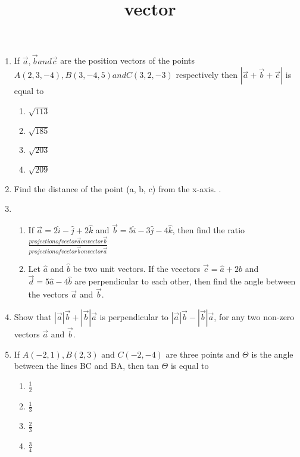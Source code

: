 \documentclass{article}
\title{vector}
\begin{document}
\begin{enumerate}
\item If $\vec{a}, \vec{b}and \vec{c}$ are the position vectors of the points $A(2,3,-4), B(3,-4,5) and C(3,2,-3)$ respectively then $|\vec{a} + \vec{b} + \vec{c}|$ is equal to
\begin{enumerate}[label=(\Alph*)]
\item $\sqrt{113}$
\item $\sqrt{185}$
\item $\sqrt{203}$
\item $\sqrt{209}$
\end{enumerate}
\item Find the distance of the point (a, b, c) from the x-axis.
.\item \begin{enumerate} %
		\item If $\vec{a}= 2\hat{i} - \hat{j} + 2\hat{k}$ and $\vec{b} = 5\hat{i} - 3\hat{j} - 4\hat{k}$, then find the ratio
	\\ $\frac{projection of vector \vec{a} on vector \vec{b}}{projection of vector \vec{b} on vector \vec{a}}$
\item Let $\hat{a}$ and $\hat{b}$ be two unit vectors. If the vecctors $\vec{c} = \hat{a} + 2\hat{b}$ and $\vec{d} = 5\hat{a} - 4\hat{b}$ are perpendicular to each other, then find the angle between the vectors $\vec{a}$ and $\vec{b}.$ 
\end{enumerate}
\item Show that $|\vec{a}|\vec{b} +|\vec{b}|\vec{a}$ is perpendicular to $|\vec{a} |\vec{b} - |\vec{b}|\vec{a}$, for any two non-zero vectors $\vec{a}$ and $\vec{b}.$
\item If $A(-2,1), B(2,3)$ and $C(-2,-4)$ are three points and $\Theta$ is the angle between the lines BC and BA, then tan $\Theta$ is equal to
	\begin{enumerate}[label=(\Alph*)]
		\item $\frac{1}{2}$
		\item $\frac{1}{3}$
		\item $\frac{2}{3}$
		\item $\frac{3}{4}$
	\end{enumerate}
\end{enumerate}
\end{document}
